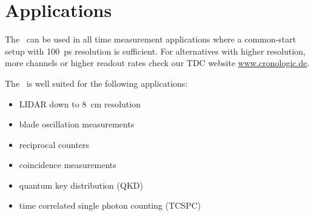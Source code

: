 \section{Applications}
	The \deviceName\  can be used in all time measurement applications where a common-start setup with \SI{100}{\pico\second} resolution is sufficient. 
	For alternatives with higher resolution, more channels or higher readout rates check our TDC website \href{https://www.cronologic.de/produkte/products-overview#tdcdata}{www.cronologic.de}.

	The \deviceName\ is well suited for the following applications:
	\begin{itemize}
		\item LIDAR down to \SI{8}{\centi\meter} resolution
		\item blade oscillation measurements
		\item reciprocal counters
		\item coincidence measurements
		\item quantum key distribution (QKD)
		\item time correlated single photon counting (TCSPC)
	\end{itemize} 
